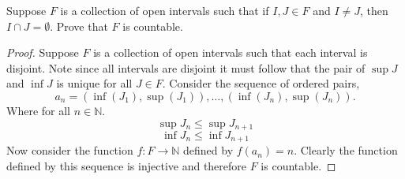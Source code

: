 \documentclass[12pt]{article}
\makeatletter
\theoremstyle{homework}
\newenvironment{exercise}[1]
{\def\@currentlabel{#1}\exercisecore}
{\endexercisecore}
\newcommand{\Nats}{\ensuremath{\mathbb N}}
\makeatother
\begin{document}
\begin{exercise}{5} Suppose $F$ is a collection of open intervals such that if $I,J \in F$ and $I \neq J$, then $I \cap J = \emptyset$. Prove that $F$ is countable.\\

  \begin{proof}
    Suppose $F$ is a collection of open intervals such that each interval is disjoint. Note since all 
    intervals are disjoint it must follow that the pair of $\sup J$ and $\inf J$ is unique for all $J \in F$. Consider the sequence of ordered pairs,
    \begin{equation*}
      a_n = (\inf(J_1),\sup(J_1)),\dots,(\inf(J_n),\sup(J_n)).
    \end{equation*}
    Where for all $n \in \Nats$.
    \begin{equation*}
      \sup J_n \leq \sup J_{n+1}
    \end{equation*}
    \begin{equation*}
      \inf J_n \leq \inf J_{n+1}
    \end{equation*}
    Now consider the function $f: F \to \Nats$ defined by $f(a_n) = n$. Clearly the function defined by this sequence is injective and therefore $F$ is countable. 
    
  \end{proof}

\end{exercise}

\vspace{.5in}
\end{document}
